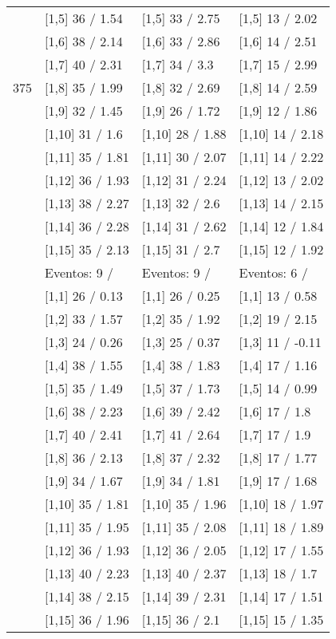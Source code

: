 \begin{table}
\begin{tabular}[t]{llll}
 & {}[1,5] 36  / 1.54 & {}[1,5] 33  / 2.75 & {}[1,5] 13  / 2.02\\
 & {}[1,6] 38  / 2.14 & {}[1,6] 33  / 2.86 & {}[1,6] 14  / 2.51\\
 & {}[1,7] 40  / 2.31 & {}[1,7] 34  / 3.3 & {}[1,7] 15  / 2.99\\
375 & {}[1,8] 35  / 1.99 & {}[1,8] 32  / 2.69 & {}[1,8] 14  / 2.59\\
\addlinespace
 & {}[1,9] 32  / 1.45 & {}[1,9] 26  / 1.72 & {}[1,9] 12  / 1.86\\
 & {}[1,10] 31  / 1.6 & {}[1,10] 28  / 1.88 & {}[1,10] 14  / 2.18\\
 & {}[1,11] 35  / 1.81 & {}[1,11] 30  / 2.07 & {}[1,11] 14  / 2.22\\
 & {}[1,12] 36  / 1.93 & {}[1,12] 31  / 2.24 & {}[1,12] 13  / 2.02\\
 & {}[1,13] 38  / 2.27 & {}[1,13] 32  / 2.6 & {}[1,13] 14  / 2.15\\
\addlinespace
 & {}[1,14] 36  / 2.28 & {}[1,14] 31  / 2.62 & {}[1,14] 12  / 1.84\\
 & {}[1,15] 35  / 2.13 & {}[1,15] 31  / 2.7 & {}[1,15] 12  / 1.92\\
 & Eventos:  9 / & Eventos:  9 / & Eventos:  6 /\\
 & {}[1,1] 26  / 0.13 & {}[1,1] 26  / 0.25 & {}[1,1] 13  / 0.58\\
 & {}[1,2] 33  / 1.57 & {}[1,2] 35  / 1.92 & {}[1,2] 19  / 2.15\\
\addlinespace
 & {}[1,3] 24  / 0.26 & {}[1,3] 25  / 0.37 & {}[1,3] 11  / -0.11\\
 & {}[1,4] 38  / 1.55 & {}[1,4] 38  / 1.83 & {}[1,4] 17  / 1.16\\
 & {}[1,5] 35  / 1.49 & {}[1,5] 37  / 1.73 & {}[1,5] 14  / 0.99\\
 & {}[1,6] 38  / 2.23 & {}[1,6] 39  / 2.42 & {}[1,6] 17  / 1.8\\
 & {}[1,7] 40  / 2.41 & {}[1,7] 41  / 2.64 & {}[1,7] 17  / 1.9\\
\addlinespace
500 & {}[1,8] 36  / 2.13 & {}[1,8] 37  / 2.32 & {}[1,8] 17  / 1.77\\
 & {}[1,9] 34  / 1.67 & {}[1,9] 34  / 1.81 & {}[1,9] 17  / 1.68\\
 & {}[1,10] 35  / 1.81 & {}[1,10] 35  / 1.96 & {}[1,10] 18  / 1.97\\
 & {}[1,11] 35  / 1.95 & {}[1,11] 35  / 2.08 & {}[1,11] 18  / 1.89\\
 & {}[1,12] 36  / 1.93 & {}[1,12] 36  / 2.05 & {}[1,12] 17  / 1.55\\
\addlinespace
 & {}[1,13] 40  / 2.23 & {}[1,13] 40  / 2.37 & {}[1,13] 18  / 1.7\\
 & {}[1,14] 38  / 2.15 & {}[1,14] 39  / 2.31 & {}[1,14] 17  / 1.51\\
 & {}[1,15] 36  / 1.96 & {}[1,15] 36  / 2.1 & {}[1,15] 15  / 1.35\\
\bottomrule
\end{tabular}
\end{table}
